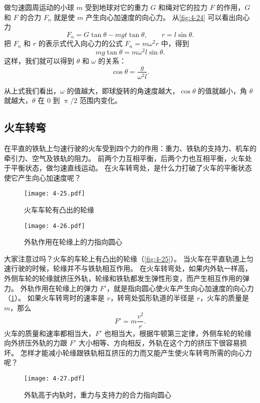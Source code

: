 \medskip
做匀速圆周运动的小球 $m$ 受到地球对它的重力 $G$ 和绳对它的拉力 $F$ 的作用，$G$ 和 $F$ 的合力 $F_n$ 就是使 $m$ 产生向心加速度的向心力。
从\cref{fig:4-24} 可以看出向心力
\[F_n=G\tan \theta-mgt\tan\theta,\qquad r=l \sin\theta. \]
把 $F_n$ 和 $r$ 的表示式代入向心力的公式 $F_n=m\omega^2r$ 中，得到
\[mg\tan\theta=m\omega^2l\sin\theta.\]
这样，我们就可以得到 $\theta$ 和 $\omega$ 的关系：
\[\cos\theta =\frac{g}{\omega^2l}.\]

从上式我们看出，$\omega$ 的值越大，即球旋转的角速度越大，$\cos\theta$ 的值就越小，角 $\theta$ 就越大，$\theta$ 在 0 到 $\uppi/2$ 范围内变化。

\subsection{火车转弯} 

在平直的铁轨上匀速行驶的火车受到四个力的作用：重力、铁轨的支持力、机车的牵引力、空气及铁轨的阻力。
前两个力互相平衡，后两个力也互相平衡，火车处于平衡状态，做匀速直线运动。
在火车转弯处，是什么力打破了火车的平衡状态使它产生向心加速度呢？

\begin{figure}
  \begin{minipage}[b]{0.48\linewidth}
  \centering
    \texttt{[image: 4-25.pdf]}
    \caption{火车车轮有凸出的轮缘}\label{fig:4-25}
  \end{minipage}
  \begin{minipage}[b]{0.48\linewidth}
    \centering
    \texttt{[image: 4-26.pdf]}
    \caption{外轨作用在轮缘上的力指向圆心}\label{fig:4-26}
  \end{minipage}
\end{figure}

大家注意过吗？火车的车轮上有凸出的轮缘（\cref{fig:4-25}）。
当火车在平直轨道上匀速行驶的时候，轮缘并不与铁轨相互作用。
在火车转弯处，如果内外轨一样高，外侧车轮的轮缘就挤压外轨，轮缘和铁轨都发生弹性形变，而产生相互作用的弹力。
外轨作用在轮缘上的弹力 $F'$，就是指向圆心使火车产生向心加速度的向心力（\cref{fig:4-26}）。
如果火车转弯时的速率是 $v$，转弯处弧形轨道的半径是 $r$，火车的质量是 $m$，那么
\[F'=m\frac{v^2}{r}.\]
火车的质量和速率都相当大，$F'$ 也相当大，根据牛顿第三定律，外侧车轮的轮缘向外挤压外轨的力跟 $F'$ 大小相等、方向相反，外轨在这个力的挤压下很容易损坏。
怎样才能减小轮缘跟铁轨相互挤压的力而又能产生使火车转弯所需的向心力呢？
\begin{figure}
  \texttt{[image: 4-27.pdf]}
  \caption{外轨高于内轨时，重力与支持力的合力指向圆心}\label{fig:4-27}
\end{figure}


